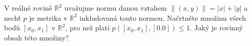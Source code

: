V reálné rovině $\mathbb{R}^{2}$ uvažujme normu danou vztahem $\left \| (x,y)
\right \|=\left | x \right |+\left | y \right |$ a nechť $p$ je metrika v
$\mathbb{R}^{2}$ inkludovaná touto normou. Načrtněte množinu všech bodů $\left [
x_{0},x_{1} \right ]$ v $\mathbb{R}^{2}$, pro než platí $p(\left [ x_{0},x_{1}
\right ],\left [ 0.0 \right ])\leq 1$. Jaký je rovinný obsah této množiny?
